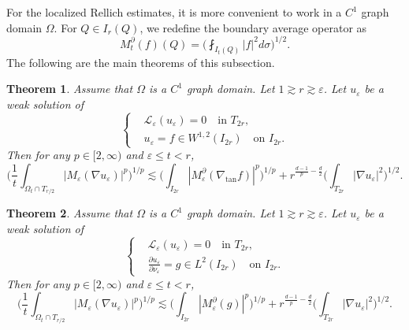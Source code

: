 \documentclass[reqno,12pt]{amsart} %
\newtheorem{theorem}{Theorem}[section]
\theoremstyle{definition}
\theoremstyle{remark}
\numberwithin{equation}{section}
\newcommand{\cL}{\mathcal{L}}
\newcommand{\e}{\varepsilon}
\begin{document}
For the localized Rellich estimates, it is more convenient to work in a $C^1$ graph domain $\Omega$. For $Q \in I_r(Q)$, we redefine the boundary average operator as
\begin{equation}\label{def.bdryMt.inIr}
    M_t^{\partial}(f)(Q) = \bigg( \fint_{I_t(Q)} |f|^2 d\sigma \bigg)^{1/2}.
\end{equation}
The following are the main theorems of this subsection.
\begin{theorem}\label{thm.LocalRellich.Rp}
    Assume that $\Omega$ is a $C^1$ graph domain.
    Let $1\gtrsim r \gtrsim \e$. Let $u_\e$ be a weak solution of
    \begin{equation}\label{eq.Rp.T2r}
    \left\{
    \begin{aligned}
        & \cL_\e(u_\e) = 0 \quad \text{in } T_{2r}, \\
        & u_\e = f \in W^{1,2}(I_{2r}) \quad \text{on } I_{2r}.
    \end{aligned}
    \right.
    \end{equation}
    Then for any $p\in [2,\infty)$ and $\e \le t < r$,
    \begin{equation}\label{est.localRellich.Rp}
        \bigg( \frac{1}{t} \int_{\Omega_t \cap T_{r/2}} |M_\e(\nabla u_\e)|^p \bigg)^{1/p} \lesssim \bigg( \int_{I_{2r}} |M_\e^\partial (\nabla_{\tan} f)|^p \bigg)^{1/p} + r^{\frac{d-1}{p} - \frac{d}{2}} \bigg( \int_{T_{2r}} |\nabla u_\e|^2 \bigg)^{1/2}.
    \end{equation}
\end{theorem}

\begin{theorem}\label{thm.LocalRellich.Np}
    Assume that $\Omega$ is a $C^1$ graph domain.
    Let $1\gtrsim r \gtrsim \e$. Let $u_\e$ be a weak solution of
    \begin{equation}\label{eq.Np.T2r}
    \left\{
    \begin{aligned}
        & \cL_\e(u_\e) = 0 \quad \text{in } T_{2r}, \\
        & \frac{\partial u_\e}{\partial \nu_\e} = g \in L^2(I_{2r}) \quad \text{on } I_{2r}.
    \end{aligned}
    \right.
    \end{equation}
    Then for any $p\in [2,\infty)$ and $\e \le t < r$,
    \begin{equation}\label{est.localRellich.Np}
        \bigg( \frac{1}{t} \int_{\Omega_t \cap T_{r/2}} |M_\e(\nabla u_\e)|^p \bigg)^{1/p} \lesssim \bigg( \int_{I_{2r}} |M_\e^\partial (g)|^p \bigg)^{1/p} + r^{\frac{d-1}{p} - \frac{d}{2}} \bigg( \int_{T_{2r}} |\nabla u_\e|^2 \bigg)^{1/2}.
    \end{equation}
\end{theorem}
\end{document}
